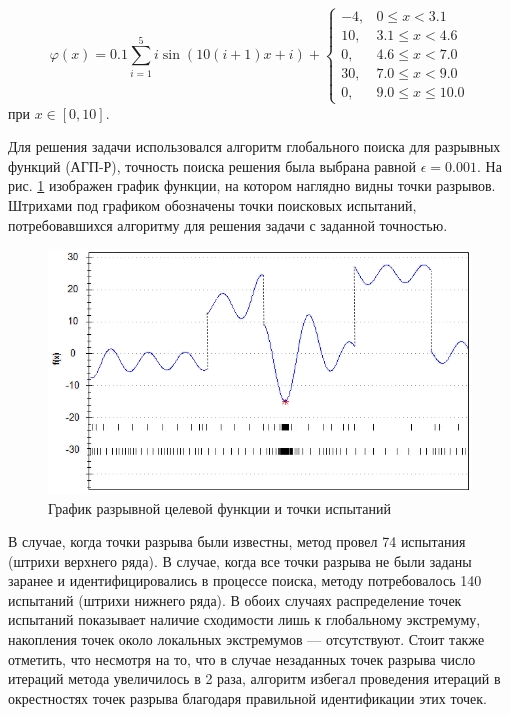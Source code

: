 \documentclass[11pt, oneside, a4paper]{article}
\begin{document}
\begin{equation}\label{test}
\varphi(x) = 0.1 \sum_{i=1}^5{i\sin(10(i+1)x+i)}+
\begin{cases}
	-4,  &0   \leq x < 3.1\\
	10,  &3.1 \leq x < 4.6\\
	 0,  &4.6 \leq x < 7.0\\
	30,  &7.0 \leq x < 9.0\\
	 0,  &9.0 \leq x \leq 10.0
\end{cases}
\end{equation}
при $x\in[0,10]$. 

Для решения задачи использовался алгоритм глобального поиска для разрывных функций (АГП-Р), точность поиска решения была выбрана равной $\epsilon = 0.001$. %
На рис. \ref{ris1} изображен график функции, на котором наглядно видны точки разрывов. Штрихами под графиком обозначены точки поисковых испытаний, потребовавшихся алгоритму для решения задачи с заданной точностью. 

\begin{figure}[!ht]
	\begin{center}
			\includegraphics[width=0.7\linewidth]{ris1_2.png}
			\caption{График разрывной целевой функции и точки испытаний} %
      \label{ris1}
	\end{center}
\end{figure}


В случае, когда точки разрыва были известны, метод провел 74 испытания (штрихи верхнего ряда). В случае, когда все точки разрыва не были заданы заранее и идентифицировались в процессе поиска, методу потребовалось 140 испытаний (штрихи нижнего ряда). В обоих случаях распределение точек испытаний показывает наличие сходимости лишь к глобальному экстремуму, накопления точек около локальных экстремумов --- отсутствуют. Стоит также отметить, что несмотря на то, что в случае незаданных точек разрыва число итераций метода увеличилось в 2 раза, алгоритм избегал проведения итераций в окрестностях точек разрыва благодаря правильной идентификации этих точек.
\end{document}
